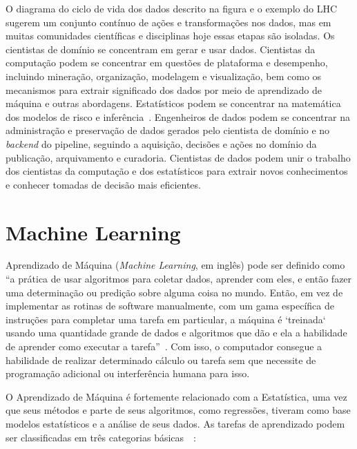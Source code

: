 \documentclass[Portugues,Final]{ic-tese-v3}
\begin{document}
O diagrama do ciclo de vida dos dados descrito na figura e o exemplo do LHC sugerem um conjunto contínuo de ações e transformações nos dados, mas em muitas comunidades científicas e disciplinas hoje essas etapas são isoladas. Os cientistas de domínio se concentram em gerar e usar dados. Cientistas da computação podem se concentrar em questões de plataforma e desempenho, incluindo mineração, organização, modelagem e visualização, bem como os mecanismos para extrair significado dos dados por meio de aprendizado de máquina e outras abordagens. Estatísticos podem se concentrar na matemática dos modelos de risco e inferência~\cite{Berman_2018}. Engenheiros de dados podem se concentrar na administração e preservação de dados gerados pelo cientista de domínio e no \textit{backend} do pipeline, seguindo a aquisição, decisões e ações no domínio da publicação, arquivamento e curadoria. Cientistas de dados podem unir o trabalho dos cientistas da computação e dos estatísticos para extrair novos conhecimentos e conhecer tomadas de decisão mais eficientes.


\section{Machine Learning}
\label{sec:MachineLearning}

Aprendizado de Máquina (\textit{Machine Learning}, em inglês) pode ser definido como “a prática de usar algoritmos para coletar dados, aprender com eles, e então fazer uma determinação ou predição sobre alguma coisa no mundo. Então, em vez de implementar as rotinas de software manualmente, com um gama específica de instruções para completar uma tarefa em particular, a máquina é `treinada` usando uma quantidade grande de dados e algoritmos que dão e ela a habilidade de aprender como executar a tarefa”~\cite{Copeland_2016}. Com isso, o computador consegue a habilidade de realizar determinado cálculo ou tarefa sem que necessite de programação adicional ou interferência humana para isso.

O Aprendizado de Máquina é fortemente relacionado com a Estatística, uma vez que seus métodos e parte de seus algoritmos, como regressões, tiveram como base modelos estatísticos e a análise de seus dados. As tarefas de aprendizado podem ser classificadas em três categorias básicas~\cite{MLWikipedia_2021}~\cite{MLSAS_2021}:
\end{document}
